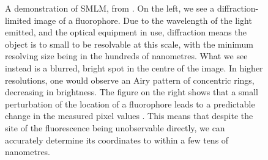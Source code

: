 \documentclass[11pt]{article}
\begin{document}
\begin{figure}[b!]
	\centering
	\qquad
	\caption{A demonstration of SMLM, from \cite{Lelek2021}. On the left, we see a diffraction-limited image of a fluorophore. Due to the wavelength of the light emitted, and the optical equipment in use, diffraction means the object is to small to be resolvable at this scale, with the minimum resolving size being in the hundreds of nanometres. What we see instead is a blurred, bright spot in the centre of the image. In higher resolutions, one would observe an Airy pattern of concentric rings, decreasing in brightness. The figure on the right shows that a small perturbation of the location of a fluorophore leads to a predictable change in the measured pixel values \cite{Lelek2021}. This means that despite the site of the fluorescence being unobservable directly, we can accurately determine its coordinates to within a few tens of nanometres.}%
\label{pixelShift}
\end{figure}
\end{document}
